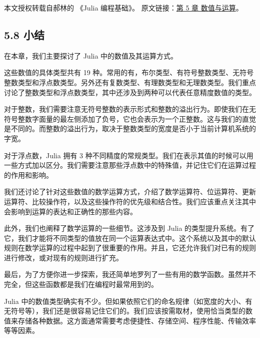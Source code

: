 
本文授权转载自郝林的 《Julia 编程基础》。 原文链接：\href{https://github.com/hyper0x/JuliaBasics/blob/master/book/ch05.md}{第 5 章 数值与运算}。


\subsection{5.8 小结}

在本章，我们主要探讨了 Julia 中的数值及其运算方式。

这些数值的具体类型共有 19 种。常用的有，布尔类型、有符号整数类型、无符号整数类型和浮点数类型。另外还有复数类型、有理数类型和无理数类型。我们重点讨论了整数类型和浮点数类型，其中还涉及到两种可以代表任意精度数值的类型。

对于整数，我们需要注意无符号整数的表示形式和整数的溢出行为。即使我们在无符号整数字面量的最左侧添加了负号，它也会表示为一个正整数。这与我们的直觉是不同的。而整数的溢出行为，取决于整数类型的宽度是否小于当前计算机系统的字宽。

对于浮点数，Julia 拥有 3 种不同精度的常规类型。我们在表示其值的时候可以用一些方式加以区分。我们需要注意那些浮点数中的特殊值，并记住它们在运算过程的作用和影响。

我们还讨论了针对这些数值的数学运算方式，介绍了数学运算符、位运算符、更新运算符、比较操作符，以及这些操作符的优先级和结合性。我们应该重点关注其中会影响到运算的表达和正确性的那些内容。

此外，我们也阐释了数学运算的一些细节。这涉及到 Julia 的类型提升系统。有了它，我们才能将不同类型的值放在同一个运算表达式中。这个系统以及其中的默认规则在数学运算的过程中起到了很重要的作用。并且，它还允许我们对已有的规则进行修改，或对现有的规则进行扩充。

最后，为了方便你进一步探索，我还简单地罗列了一些有用的数学函数。虽然并不完全，但这些函数都是我们在编程时最常用到的。

Julia 中的数值类型确实有不少。但如果依照它们的命名规律（如宽度的大小、有无符号等），我们还是很容易记住它们的。我们应该按需取材，使用恰当类型的数值来存储各种数据。这方面通常需要考虑便捷性、存储空间、程序性能、传输效率等等因素。
